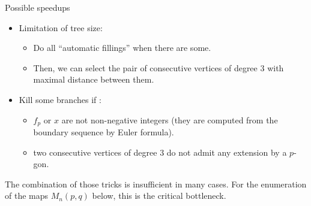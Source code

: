 \documentclass[%
pdf,
colorBG,
slideColor,
]{prosper}
\begin{document}







\begin{slide}{Possible speedups}

\begin{itemize}
\item Limitation of tree size:
\begin{itemize}
\item Do all ``automatic fillings'' when there are some.
\item Then, we can select the pair of consecutive vertices of degree $3$ with maximal distance between them.
\end{itemize}
\item Kill some branches if :
\begin{itemize}
\item $f_p$ or $x$ are not non-negative integers (they are computed from the boundary sequence by Euler formula).
\item two consecutive vertices of degree $3$ do not admit any extension by a $p$-gon.
\end{itemize}
\end{itemize}
The combination of those tricks is insufficient in many cases.
For the enumeration of the maps $M_n(p,q)$ below, this is the critical bottleneck.


\end{slide}
\end{document}
